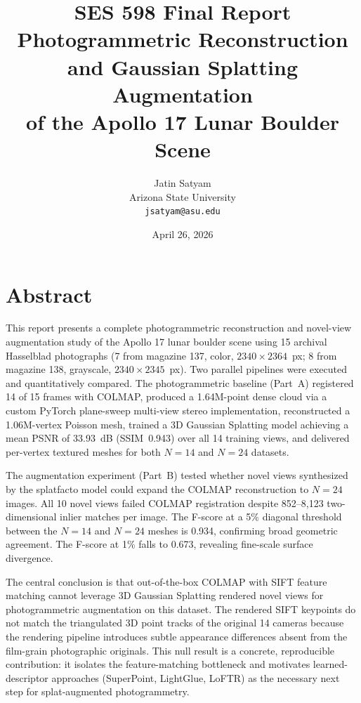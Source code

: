 \documentclass[12pt]{article}
\title{\textbf{SES 598 Final Report}\\
Photogrammetric Reconstruction and Gaussian Splatting Augmentation\\
of the Apollo 17 Lunar Boulder Scene}
\author{Jatin Satyam\\
Arizona State University\\
\texttt{jsatyam@asu.edu}}
\date{April 26, 2026}
\begin{document}
\maketitle
\tableofcontents
\clearpage

\section{Abstract}

This report presents a complete photogrammetric reconstruction and novel-view augmentation study of the Apollo 17 lunar boulder scene using 15 archival Hasselblad photographs (7 from magazine 137, color, $2340 \times 2364$~px; 8 from magazine 138, grayscale, $2340 \times 2345$~px). Two parallel pipelines were executed and quantitatively compared. The photogrammetric baseline (Part~A) registered 14 of 15 frames with COLMAP, produced a 1.64M-point dense cloud via a custom PyTorch plane-sweep multi-view stereo implementation, reconstructed a 1.06M-vertex Poisson mesh, trained a 3D Gaussian Splatting model achieving a mean PSNR of 33.93~dB (SSIM~0.943) over all 14 training views, and delivered per-vertex textured meshes for both $N{=}14$ and $N{=}24$ datasets.

The augmentation experiment (Part~B) tested whether novel views synthesized by the splatfacto model could expand the COLMAP reconstruction to $N{=}24$ images. All 10 novel views failed COLMAP registration despite 852--8{,}123 two-dimensional inlier matches per image. The F-score at a 5\% diagonal threshold between the $N{=}14$ and $N{=}24$ meshes is 0.934, confirming broad geometric agreement. The F-score at 1\% falls to 0.673, revealing fine-scale surface divergence.

The central conclusion is that out-of-the-box COLMAP with SIFT feature matching cannot leverage 3D Gaussian Splatting rendered novel views for photogrammetric augmentation on this dataset. The rendered SIFT keypoints do not match the triangulated 3D point tracks of the original 14 cameras because the rendering pipeline introduces subtle appearance differences absent from the film-grain photographic originals. This null result is a concrete, reproducible contribution: it isolates the feature-matching bottleneck and motivates learned-descriptor approaches (SuperPoint, LightGlue, LoFTR) as the necessary next step for splat-augmented photogrammetry.
\end{document}

